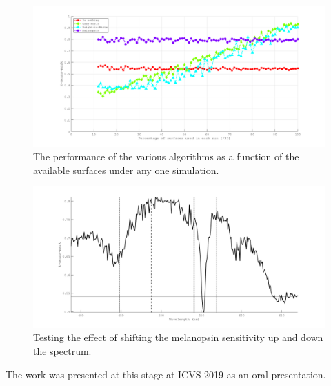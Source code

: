 \begin{figure}[htbp]
 \includegraphics[max width=\textwidth]{figs/comp/melcomp_9/4a_summary.png}
 \caption{The performance of the various algorithms as a function of the available surfaces under any one simulation.}
 \label{fig:4asum}
\end{figure} 

\begin{figure}[htbp]
 \includegraphics[max width=\textwidth]{figs/comp/melcomp_9/5a_diffMel.png}
 \caption{Testing the effect of shifting the melanopsin sensitivity up and down the spectrum.}
 \label{fig:9opt}
\end{figure} 

The work was presented at this stage at ICVS 2019 as an oral presentation.
